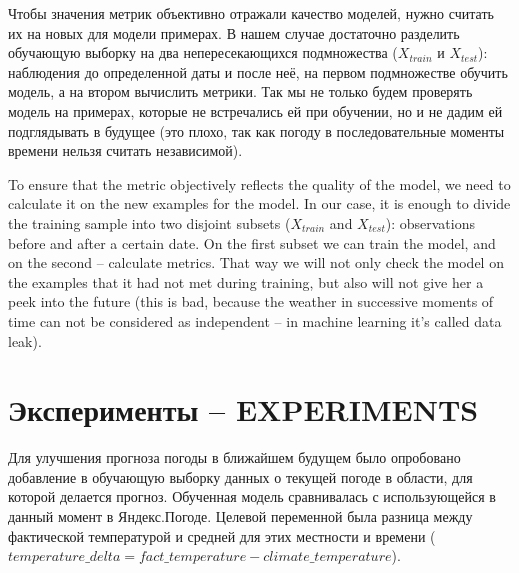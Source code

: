 \documentclass[14pt]{matmex-diploma}
\begin{document}

Чтобы значения метрик объективно отражали качество моделей, нужно считать их на новых для модели примерах. В нашем случае достаточно разделить обучающую выборку на два непересекающихся подмножества ($X_{train}$ и $X_{test}$): наблюдения до определенной даты и после неё, на первом подмножестве обучить модель, а на втором вычислить метрики. Так мы не только будем проверять модель на примерах, которые не встречались ей при обучении, но и не дадим ей подглядывать в будущее (это плохо, так как погоду в последовательные моменты времени нельзя считать независимой).  

To ensure that the metric objectively reflects the quality of the model, we need to calculate it on the new examples for the model. In our case, it is enough to divide the training sample into two disjoint subsets ($X_{train}$ and $X_{test}$): observations before and after a certain date. On the first subset we can train the model, and on the second -- calculate metrics. That way we will not only check the model on the examples that it had not met during training, but also will not give her a peek into the future (this is bad, because the weather in successive moments of time can not be considered as independent -- in machine learning it's called data leak).


\section{Эксперименты -- EXPERIMENTS}

Для улучшения прогноза погоды в ближайшем будущем было опробовано добавление в обучающую выборку данных о текущей погоде в области, для которой делается прогноз. Обученная модель сравнивалась с использующейся в данный момент в Яндекс.Погоде. Целевой переменной была разница между фактической температурой и средней для этих местности и времени ($temperature\_delta = fact\_temperature - climate\_temperature$).
\end{document}
